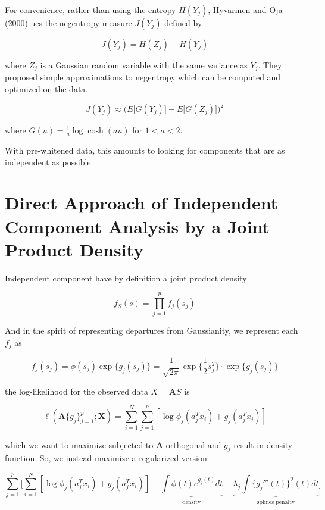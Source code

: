 \documentclass{article}
\begin{document}
For convenience, rather than using the entropy $H(Y_j)$, Hyvarinen and Oja (2000) ues the negentropy measure $J(Y_j)$ defined by

\begin{equation}
	J(Y_j) = H(Z_j) - H(Y_j)
\end{equation}

where $Z_j$ is a Gaussian random variable with the same variance as $Y_j$. They proposed simple approximations to negentropy which can be computed and optimized on the data.

\begin{equation}
	J(Y_j) \approx \bigg(E\big[G(Y_j)\big] - E\big[ G(Z_j) \big] \bigg)^2
\end{equation}

where $G(u) = \frac{1}{a}\log\cosh (au)$ for $1 < a < 2$.

With pre-whitened data, this amounts to looking for components that are as independent as possible.

\section{Direct Approach of Independent Component Analysis by a Joint Product Density}

Independent component have by definition a joint product density

\begin{equation}
	f_S(s) = \prod_{j = 1}^p f_j(s_j)
\end{equation}

And in the spirit of representing departures from Gaussianity, we represent each $f_j$ as

\begin{equation}
	f_j(s_j) = \phi(s_j)\exp\{g_j(s_j) \} = \frac{1}{\sqrt{2\pi}}\exp\{\frac{1}{2}s_j^2 \}\cdot \exp\{g_j(s_j) \}
\end{equation}

the log-likelihood for the observed data $X = \pmb A S$ is

\begin{equation}
	\ell(\pmb A\{g_j\}_{j=1}^p; \pmb X) = \sum_{i=1}^N\sum_{j=1}^p[\log \phi_j(a_j^Tx_i) + g_j(a_j^Tx_i) ]
\end{equation}

which we want to maximize subjected to $\pmb A$ orthogonal and $g_j$ result in density function. So, we instead maximize a regularized version 

\begin{equation}
	\sum_{j=1}^p\Big[ \sum_{i=1}^N [\log \phi_j(a_j^Tx_i) + g_j(a_j^Tx_i) ] - \underbrace{\int \phi(t)e^{g_j(t)}dt}_{\text{density}} - \underbrace{\lambda_j\int\{g_j'''(t) \}^2(t)dt}_{\text{splines penalty}}  \Big]
\end{equation}
\end{document}
